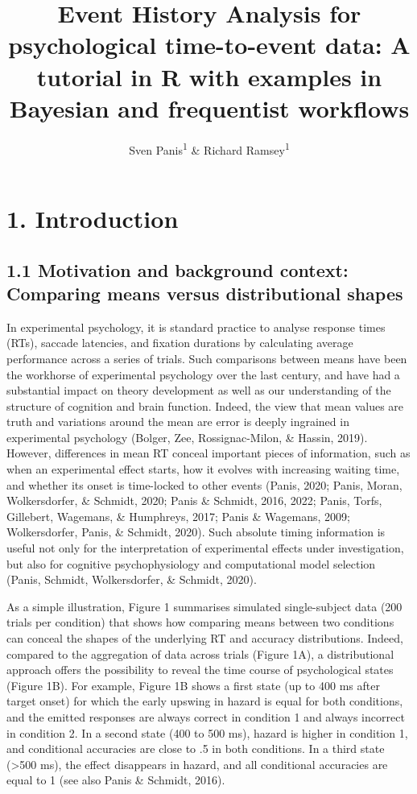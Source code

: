 \documentclass[
  man, donotrepeattitle,floatsintext]{apa6}
\title{Event History Analysis for psychological time-to-event data: A tutorial in R with examples in Bayesian and frequentist workflows}
\author{Sven Panis\textsuperscript{1} \& Richard Ramsey\textsuperscript{1}}
\date{}
\affiliation{\vspace{0.5cm}\textsuperscript{1} ETH Zürich}
\begin{document}
\maketitle

\section{1. Introduction}\label{introduction}

\subsection{1.1 Motivation and background context: Comparing means versus distributional shapes}\label{motivation-and-background-context-comparing-means-versus-distributional-shapes}

In experimental psychology, it is standard practice to analyse response times (RTs), saccade latencies, and fixation durations by calculating average performance across a series of trials. Such comparisons between means have been the workhorse of experimental psychology over the last century, and have had a substantial impact on theory development as well as our understanding of the structure of cognition and brain function. Indeed, the view that mean values are truth and variations around the mean are error is deeply ingrained in experimental psychology (Bolger, Zee, Rossignac-Milon, \& Hassin, 2019). However, differences in mean RT conceal important pieces of information, such as when an experimental effect starts, how it evolves with increasing waiting time, and whether its onset is time-locked to other events (Panis, 2020; Panis, Moran, Wolkersdorfer, \& Schmidt, 2020; Panis \& Schmidt, 2016, 2022; Panis, Torfs, Gillebert, Wagemans, \& Humphreys, 2017; Panis \& Wagemans, 2009; Wolkersdorfer, Panis, \& Schmidt, 2020). Such absolute timing information is useful not only for the interpretation of experimental effects under investigation, but also for cognitive psychophysiology and computational model selection (Panis, Schmidt, Wolkersdorfer, \& Schmidt, 2020).

As a simple illustration, Figure 1 summarises simulated single-subject data (200 trials per condition) that shows how comparing means between two conditions can conceal the shapes of the underlying RT and accuracy distributions. Indeed, compared to the aggregation of data across trials (Figure 1A), a distributional approach offers the possibility to reveal the time course of psychological states (Figure 1B). For example, Figure 1B shows a first state (up to 400 ms after target onset) for which the early upswing in hazard is equal for both conditions, and the emitted responses are always correct in condition 1 and always incorrect in condition 2. In a second state (400 to 500 ms), hazard is higher in condition 1, and conditional accuracies are close to .5 in both conditions. In a third state (\textgreater500 ms), the effect disappears in hazard, and all conditional accuracies are equal to 1 (see also Panis \& Schmidt, 2016).
\end{document}
